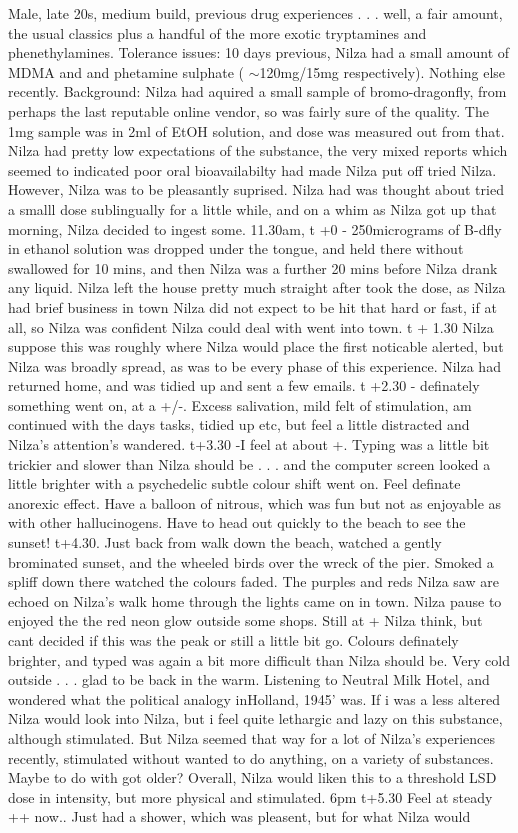 \documentclass[12pt]{book}
\begin{document}
Male, late 20s, medium build, previous drug experiences . . .  well, a fair amount, the usual classics plus a handful of the more exotic tryptamines and phenethylamines. Tolerance issues: 10 days previous, Nilza had a small amount of MDMA and and phetamine sulphate ( $\sim$120mg/15mg respectively). Nothing else recently. Background: Nilza had aquired a small sample of bromo-dragonfly, from perhaps the last reputable online vendor, so was fairly sure of the quality. The 1mg sample was in 2ml of EtOH solution, and dose was measured out from that. Nilza had pretty low expectations of the substance, the very mixed reports which seemed to indicated poor oral bioavailabilty had made Nilza put off tried Nilza. However, Nilza was to be pleasantly suprised. Nilza had was thought about tried a smalll dose sublingually for a little while, and on a whim as Nilza got up that morning, Nilza decided to ingest some. 11.30am, t +0 - 250micrograms of B-dfly in ethanol solution was dropped under the tongue, and held there without swallowed for 10 mins, and then Nilza was a further 20 mins before Nilza drank any liquid. Nilza left the house pretty much straight after took the dose, as Nilza had brief business in town Nilza did not expect to be hit that hard or fast, if at all, so Nilza was confident Nilza could deal with went into town. t + 1.30 Nilza suppose this was roughly where Nilza would place the first noticable alerted, but Nilza was broadly spread, as was to be every phase of this experience. Nilza had returned home, and was tidied up and sent a few emails. t +2.30 - definately something went on, at a +/-. Excess salivation, mild felt of stimulation, am continued with the days tasks, tidied up etc, but feel a little distracted and Nilza's attention's wandered. t+3.30 -I feel at about +. Typing was a little bit trickier and slower than Nilza should be . . .  and the computer screen looked a little brighter with a psychedelic subtle colour shift went on. Feel definate anorexic effect. Have a balloon of nitrous, which was fun but not as enjoyable as with other hallucinogens. Have to head out quickly to the beach to see the sunset! t+4.30. Just back from walk down the beach, watched a gently brominated sunset, and the wheeled birds over the wreck of the pier. Smoked a spliff down there watched the colours faded. The purples and reds Nilza saw are echoed on Nilza's walk home through the lights came on in town. Nilza pause to enjoyed the the red neon glow outside some shops. Still at + Nilza think, but cant decided if this was the peak or still a little bit go. Colours definately brighter, and typed was again a bit more difficult than Nilza should be. Very cold outside . . .  glad to be back in the warm. Listening to Neutral Milk Hotel, and wondered what the political analogy inHolland, 1945' was. If i was a less altered Nilza would look into Nilza, but i feel quite lethargic and lazy on this substance, although stimulated. But Nilza seemed that way for a lot of Nilza's experiences recently, stimulated without wanted to do anything, on a variety of substances. Maybe to do with got older? Overall, Nilza would liken this to a threshold LSD dose in intensity, but more physical and stimulated. 6pm t+5.30 Feel at steady ++ now.. Just had a shower, which was pleasent, but for what Nilza would 
\end{document}
